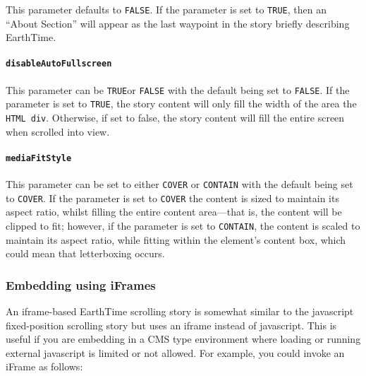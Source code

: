 \documentclass[
  12pt,
]{krantz}
\begin{document}
This parameter defaults to \texttt{FALSE}. If the parameter is set to \texttt{TRUE}, then an ``About Section'' will appear as the last waypoint in the story briefly describing EarthTime.

\hypertarget{disableautofullscreen}{%
\paragraph*{\texorpdfstring{\texttt{disableAutoFullscreen}}{disableAutoFullscreen}}\label{disableautofullscreen}}

This parameter can be \texttt{TRUE}or \texttt{FALSE} with the default being set to \texttt{FALSE}. If the parameter is set to \texttt{TRUE}, the story content will only fill the width of the area the \texttt{HTML\ div}. Otherwise, if set to false, the story content will fill the entire screen when scrolled into view.

\hypertarget{mediafitstyle}{%
\paragraph*{\texorpdfstring{\texttt{mediaFitStyle}}{mediaFitStyle}}\label{mediafitstyle}}

This parameter can be set to either \texttt{COVER} or \texttt{CONTAIN} with the default being set to \texttt{COVER}. If the parameter is set to \texttt{COVER} the content is sized to maintain its aspect ratio, whilst filling the entire content area---that is, the content will be clipped to fit; however, if the parameter is set to \texttt{CONTAIN}, the content is scaled to maintain its aspect ratio, while fitting within the element's content box, which could mean that letterboxing occurs.

\hypertarget{embedding-using-iframes}{%
\subsubsection*{Embedding using iFrames}\label{embedding-using-iframes}}


An iframe-based EarthTime scrolling story is somewhat similar to the javascript fixed-position scrolling story but uses an iframe instead of javascript. This is useful if you are embedding in a CMS type environment where loading or running external javascript is limited or not allowed. For example, you could invoke an iFrame as follows:
\end{document}
